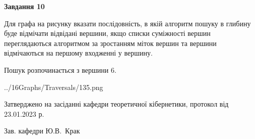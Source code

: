 \documentclass[12pt, ukrainian]{article}
\begin{document}
{\begin {large}
{\begin {center}\textbf{Завдання 10}\end {center}}\par
Для графа на рисунку вказати послідовність, в якій алгоритм пошуку в глибину буде відмічати відвідані вершини, якщо списки суміжності вершин переглядаються алгоритмом за зростанням міток вершин та вершини відмічаються на першому вход\-женні у вершину.\par
Пошук розпочинається з вершини 6.\par

\begin{center}
	{../16Graphs/Traversals/135.png}
\end{center}\par
\newpage


\end {large}
}
{\smallskip \begin {small} Затверджено на засіданні кафедри теоретичної кібернетики, протокол  від   23.01.2023 р.\par\smallskip\smallskip
{\parbox {6.5 cm}{Зав. кафедри \dotfill Ю.В.~Крак}} \end{small}}
\end{document}
